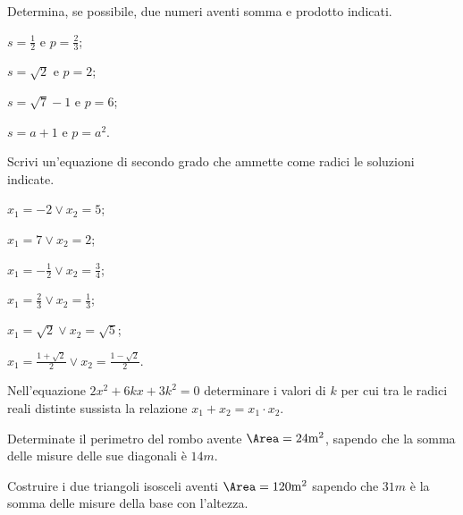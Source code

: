 \begin{esercizio}
 \label{ese:3.78}
Determina, se possibile, due numeri aventi somma e prodotto indicati.
\begin{multicols}{2}
\begin{enumeratea}
\item $s = \frac{1}{2} \text{ e } p = \frac{2}{3}$;
\item $s = \sqrt{2} \text{ e } p = 2$;
\item $s = \sqrt{7}-1 \text{ e } p = 6$;
\item $s = a + 1 \text{ e } p= a^{2}$.
\end{enumeratea}
\end{multicols}
\end{esercizio}

\begin{esercizio}
 \label{ese:3.79}
Scrivi un'equazione di secondo grado che ammette come radici le soluzioni indicate.
\begin{multicols}{2}
\begin{enumeratea}
\item $x_{1} =-2 \vee x_{2} = 5$;
\item $x_{1} = 7 \vee x_{2} = 2$;
\item $x_{1} =-\frac{1}{2} \vee x_{2} = \frac{3}{4}$;
\item $x_{1} = \frac{2}{3} \vee x_{2} = \frac{1}{3}$;
\item $x_{1} = \sqrt{2} \vee x_{2} = \sqrt{5}$;
\item $x_{1} = \frac{1 + \sqrt{2}}{2} \vee x_{2} = \frac{1-\sqrt{2}}{2}$.
\end{enumeratea}
\end{multicols}
\end{esercizio}

\begin{esercizio}
 \label{ese:3.80}
Nell'equazione $2 x^{2} + 6 k x + 3 k^{2} = 0$ determinare i valori di $k$ per cui tra le radici reali distinte sussista la relazione $x_{1} + x_{2} = x_{1} \cdot x_{2}$.
\end{esercizio}

\begin{esercizio}
 \label{ese:3.81}
Determinate il perimetro del rombo avente $\Area = 24\unit{m^{2}}$, sapendo che la somma delle misure delle sue diagonali è $14\unit{m}$.
\end{esercizio}

\begin{esercizio}
\label{ese:3.82}
Costruire i due triangoli isosceli aventi $\Area = 120\unit{m^{2}}$ sapendo che $31\unit{m}$ è la somma delle misure della base con l'altezza.
\end{esercizio}

